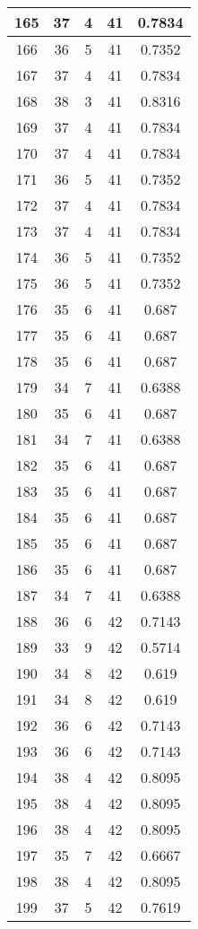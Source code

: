 \documentclass[letterpaper, 12pt]{article}
\begin{document}
\begin{longtable}{|c|c|c|c|c|}
\hline
165 & 37 & 4 & 41 & 0.7834 \\
\hline
166 & 36 & 5 & 41 & 0.7352 \\
\hline
167 & 37 & 4 & 41 & 0.7834 \\
\hline
168 & 38 & 3 & 41 & 0.8316 \\
\hline
169 & 37 & 4 & 41 & 0.7834 \\
\hline
170 & 37 & 4 & 41 & 0.7834 \\
\hline
171 & 36 & 5 & 41 & 0.7352 \\
\hline
172 & 37 & 4 & 41 & 0.7834 \\
\hline
173 & 37 & 4 & 41 & 0.7834 \\
\hline
174 & 36 & 5 & 41 & 0.7352 \\
\hline
175 & 36 & 5 & 41 & 0.7352 \\
\hline
176 & 35 & 6 & 41 & 0.687 \\
\hline
177 & 35 & 6 & 41 & 0.687 \\
\hline
178 & 35 & 6 & 41 & 0.687 \\
\hline
179 & 34 & 7 & 41 & 0.6388 \\
\hline
180 & 35 & 6 & 41 & 0.687 \\
\hline
181 & 34 & 7 & 41 & 0.6388 \\
\hline
182 & 35 & 6 & 41 & 0.687 \\
\hline
183 & 35 & 6 & 41 & 0.687 \\
\hline
184 & 35 & 6 & 41 & 0.687 \\
\hline
185 & 35 & 6 & 41 & 0.687 \\
\hline
186 & 35 & 6 & 41 & 0.687 \\
\hline
187 & 34 & 7 & 41 & 0.6388 \\
\hline
188 & 36 & 6 & 42 & 0.7143 \\
\hline
189 & 33 & 9 & 42 & 0.5714 \\
\hline
190 & 34 & 8 & 42 & 0.619 \\
\hline
191 & 34 & 8 & 42 & 0.619 \\
\hline
192 & 36 & 6 & 42 & 0.7143 \\
\hline
193 & 36 & 6 & 42 & 0.7143 \\
\hline
194 & 38 & 4 & 42 & 0.8095 \\
\hline
195 & 38 & 4 & 42 & 0.8095 \\
\hline
196 & 38 & 4 & 42 & 0.8095 \\
\hline
197 & 35 & 7 & 42 & 0.6667 \\
\hline
198 & 38 & 4 & 42 & 0.8095 \\
\hline
199 & 37 & 5 & 42 & 0.7619 \\
\hline
\end{longtable}
\end{document}
